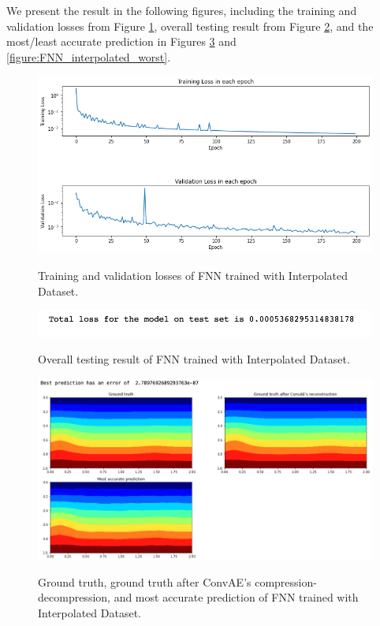 We present the result in the following figures, including the training and validation losses from Figure \ref{figure:FNN_interpolated_losses}, overall testing result from Figure \ref{figure:FNN_interpolated_testing}, and the most/least accurate prediction in Figures \ref{figure:FNN_interpolated_best} and \ref{figure:FNN_interpolated_worst}.

\begin{figure}[H]
    \caption{Training and validation losses of FNN trained with Interpolated Dataset.}
    \includegraphics[scale=0.6]{figures/mantle_convection_images/larger_dataset_interpolated/FNN_trainingData.png}
    \label{figure:FNN_interpolated_losses}
\end{figure}

\begin{figure}[H]
    \caption{Overall testing result of FNN trained with Interpolated Dataset.}
    \includegraphics[scale=0.8]{figures/mantle_convection_images/larger_dataset_interpolated/FNN_OverallTesting.png}
    \label{figure:FNN_interpolated_testing}
\end{figure}

\begin{figure}[H]
    \caption{Ground truth, ground truth after ConvAE's compression-decompression, and most accurate prediction of FNN trained with Interpolated Dataset.}
    \includegraphics[scale=0.5]{figures/mantle_convection_images/larger_dataset_interpolated/FNN_Best.png}
    \label{figure:FNN_interpolated_best}
\end{figure}

